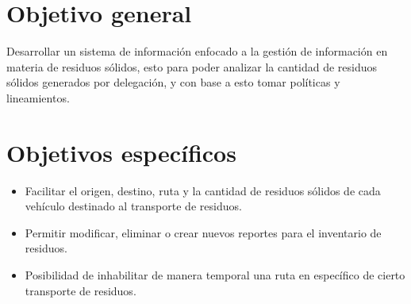 
\section{Objetivo general}
Desarrollar un sistema de información enfocado a la gestión de información en materia de residuos sólidos, esto para poder analizar la cantidad de residuos sólidos generados por delegación, y con base a esto tomar políticas y lineamientos.

\section{Objetivos específicos}

\begin{itemize}
	\item Facilitar el origen, destino, ruta y la cantidad de residuos sólidos de cada vehículo destinado al transporte de residuos.
	
	\item Permitir modificar, eliminar o crear nuevos reportes para el inventario de residuos.
	
	\item Posibilidad de inhabilitar de manera temporal una ruta en específico de cierto transporte de residuos.
\end{itemize}

